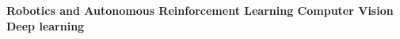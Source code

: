 \begin{cventries}
\begin{flushleft}
\textbf{{\fontsize{10pt}{1em}\bodyfontlight\upshape\color{text}  
    \bullet \space \textbf{Robotics and Autonomous}\newline
    \bullet \space \textbf{Reinforcement Learning}\newline
    \bullet \space \textbf{Computer Vision}\newline
    \bullet \space \textbf{Deep learning}\newline
    }}
\end{flushleft}
\end{cventries}
